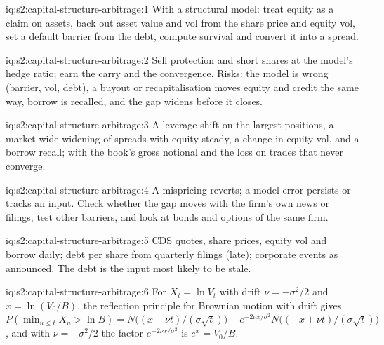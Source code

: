 \begin{solution}{iq:s2:capital-structure-arbitrage:1}
With a structural model: treat equity as a claim on assets, back out asset value and vol from the share price and equity vol, set a default barrier
from the debt, compute survival and convert it into a spread.
\end{solution}

\begin{solution}{iq:s2:capital-structure-arbitrage:2}
Sell protection and short shares at the model's hedge ratio; earn the carry and the convergence. Risks: the model is wrong (barrier, vol, debt), a
buyout or recapitalisation moves equity and credit the same way, borrow is recalled, and the gap widens before it closes.
\end{solution}

\begin{solution}{iq:s2:capital-structure-arbitrage:3}
A leverage shift on the largest positions, a market-wide widening of spreads with equity steady, a change in equity vol, and a borrow recall; with
the book's gross notional and the loss on trades that never converge.
\end{solution}

\begin{solution}{iq:s2:capital-structure-arbitrage:4}
A mispricing reverts; a model error persists or tracks an input. Check whether the gap moves with the firm's own news or filings, test other
barriers, and look at bonds and options of the same firm.
\end{solution}

\begin{solution}{iq:s2:capital-structure-arbitrage:5}
CDS quotes, share prices, equity vol and borrow daily; debt per share from quarterly filings (late); corporate events as announced. The debt is the
input most likely to be stale.
\end{solution}

\begin{solution}{iq:s2:capital-structure-arbitrage:6}
For $X_t = \ln V_t$ with drift $\nu = -\sigma^2/2$ and $x = \ln(V_0/B)$, the reflection principle for Brownian motion with drift gives
$P(\min_{u \le t} X_u > \ln B) = N\big((x + \nu t)/(\sigma\sqrt t)\big) - e^{-2\nu x/\sigma^2}N\big((-x + \nu t)/(\sigma\sqrt t)\big)$, and with
$\nu = -\sigma^2/2$ the factor $e^{-2\nu x/\sigma^2}$ is $e^{x} = V_0/B$.
\end{solution}
